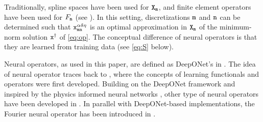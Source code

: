 \documentclass[10pt]{article}
\numberwithin{equation}{section}
\theoremstyle{nonumberplain}
\newcommand{\X}{{\tt X}}
\newcommand{\m}{{\tt m}}
\newcommand{\n}{{\tt n}}
\newcommand{\x}{{\tt x}}
\newcommand{\xdag}{\x^\dagger}
\begin{document}
Traditionally, spline spaces have been used for $\X_\m$, and finite element operators have been used for $F_\n$ (see \cite{Neu89,NeuSch90,PoeResSch10}). In this setting, discretizations $\m$ and $\n$ can be determined such that $\x_{\m\n}^{\alpha\delta\eta}$ is an optimal approximation in $\X_\m$ of the minimum-norm solution $\xdag$ of \autoref{eq:op}. The conceptual difference of neural operators is that they are learned from training data (see \autoref{eq:S} below).

Neural operators, as used in this paper, are defined as DeepONet's in \cite{LuJinPanZhaKar21}. The idea of neural operator traces back to \cite{CheChe93,TiaHon95}, where the concepts of learning functionals and operators were first developed. Building on the DeepONet framework and inspired by the physics informed neural networks \cite{RaiPerKar19}, other type of neural operators have been developed in \cite{WanWanPer21}. In parallel with DeepONet-based implementations, the Fourier neural operator has been introduced in \cite{LiKovAziLiuBha20_report}.  
\end{document}
